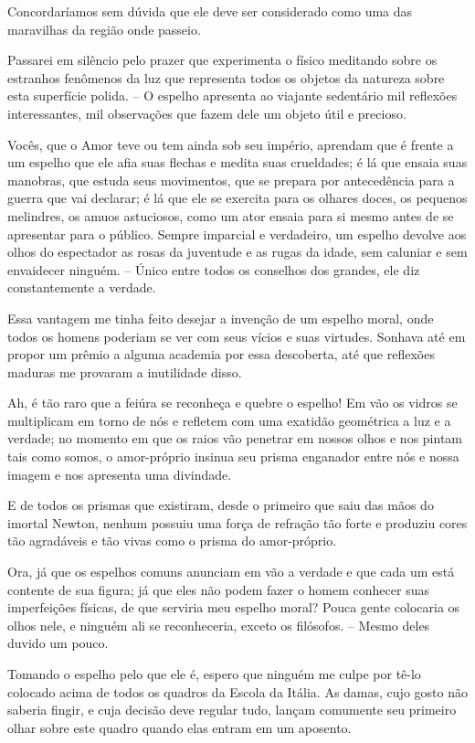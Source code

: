  Concordaríamos sem dúvida que ele deve ser considerado como uma das
maravilhas da região onde passeio.

 Passarei em silêncio pelo prazer que experimenta o físico meditando
sobre os estranhos fenômenos da luz que representa todos os objetos da
natureza sobre esta superfície polida. -- O espelho apresenta ao
viajante sedentário mil reflexões interessantes, mil observações que
fazem dele um objeto útil e precioso.

 Vocês, que o Amor teve ou tem ainda sob seu império, aprendam que é
frente a um espelho que ele afia suas flechas e medita suas crueldades;
é lá que ensaia suas manobras, que estuda seus movimentos, que se
prepara por antecedência para a guerra que vai declarar; é lá que ele
se exercita para os olhares doces, os pequenos melindres, os amuos
astuciosos, como um ator ensaia para si mesmo antes de se apresentar
para o público. Sempre imparcial e verdadeiro, um espelho devolve aos
olhos do espectador as rosas da juventude e as rugas da idade, sem
caluniar e sem envaidecer ninguém. -- Único entre todos os conselhos
dos grandes, ele diz constantemente a verdade.

Essa vantagem me tinha feito desejar a invenção de um espelho moral,
onde todos os homens poderiam se ver com seus vícios e suas virtudes.
Sonhava até em propor um prêmio a alguma academia por essa descoberta,
até que reflexões maduras me provaram a inutilidade disso.

Ah, é tão raro que a feiúra se reconheça e quebre o espelho! Em vão os
vidros se multiplicam em torno de nós e refletem com uma exatidão
geométrica a luz e a verdade; no momento em que os raios vão penetrar
em nossos olhos e nos pintam tais como somos, o amor-próprio insinua
seu prisma enganador entre nós e nossa imagem e nos apresenta uma
divindade.

E de todos os prismas que existiram, desde o primeiro que saiu das mãos
do imortal Newton, nenhum possuiu uma força de refração tão forte e
produziu cores tão agradáveis e tão vivas como o prisma do
amor-próprio.

Ora, já que os espelhos comuns anunciam em vão a verdade e que cada um
está contente de sua figura; já que eles não podem fazer o homem
conhecer suas imperfeições físicas, de que serviria meu espelho moral?
Pouca gente colocaria os olhos nele, e ninguém ali se reconheceria,
exceto os filósofos. -- Mesmo deles duvido um pouco.

Tomando o espelho pelo que ele é, espero que ninguém me culpe por tê-lo
colocado acima de todos os quadros da Escola da Itália. As damas, cujo
gosto não saberia fingir, e cuja decisão deve regular tudo, lançam
comumente seu primeiro olhar sobre este quadro quando elas entram em um
aposento. 

